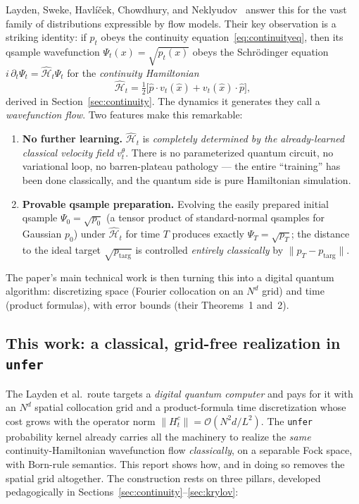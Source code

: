 \documentclass[11pt, a4paper]{article}
\newcommand{\Hgen}{\hat{\mathcal{H}}}
\begin{document}
Layden, Sweke, Havl\'i\v{c}ek, Chowdhury, and Neklyudov~\cite{Layden2025}
answer this for the vast family of distributions expressible by flow models.
Their key observation is a striking identity: if $p_t$ obeys the continuity
equation~\eqref{eq:continuityeq}, then its qsample wavefunction
$\Psi_t(x)=\sqrt{p_t(x)}$ obeys the Schr\"odinger equation
$i\,\partial_t\Psi_t=\Hgen_t\Psi_t$ for the \emph{continuity Hamiltonian}
\begin{equation}
  \Hgen_t=\tfrac12\bigl[\hat p\cdot v_t(\hat x)+v_t(\hat x)\cdot\hat p\bigr],
  \label{eq:continuityH}
\end{equation}
derived in Section~\ref{sec:continuity}. The dynamics it generates they call a
\emph{wavefunction flow}. Two features make this remarkable:
\begin{enumerate}
\item \textbf{No further learning.} $\Hgen_t$ is \emph{completely determined by
the already-learned classical velocity field} $v_t^\theta$. There is no
parameterized quantum circuit, no variational loop, no barren-plateau
pathology --- the entire ``training'' has been done classically, and the
quantum side is pure Hamiltonian simulation.
\item \textbf{Provable qsample preparation.} Evolving the easily prepared
initial qsample $\Psi_0=\sqrt{p_0}$ (a tensor product of standard-normal
qsamples for Gaussian $p_0$) under $\Hgen_t$ for time $T$ produces exactly
$\Psi_T=\sqrt{p_T}$; the distance to the ideal target $\sqrt{p_{\mathrm{targ}}}$
is controlled \emph{entirely classically} by $\|p_T-p_{\mathrm{targ}}\|$.
\end{enumerate}
The paper's main technical work is then turning this into a digital quantum
algorithm: discretizing space (Fourier collocation on an $N^d$ grid) and time
(product formulas), with error bounds (their Theorems~1 and~2).

\subsection{This work: a classical, grid-free realization in \texttt{unfer}}

The Layden et al.\ route targets a \emph{digital quantum computer} and pays for
it with an $N^d$ spatial collocation grid and a product-formula time
discretization whose cost grows with the operator norm $\|H_t^c\|=
\mathcal{O}(N^2 d/L^2)$. The \texttt{unfer} probability kernel already carries
all the machinery to realize the \emph{same} continuity-Hamiltonian
wavefunction flow \emph{classically}, on a separable Fock space, with Born-rule
semantics. This report shows how, and in doing so removes the spatial grid
altogether. The construction rests on three pillars, developed pedagogically
in Sections~\ref{sec:continuity}--\ref{sec:krylov}:
\end{document}
